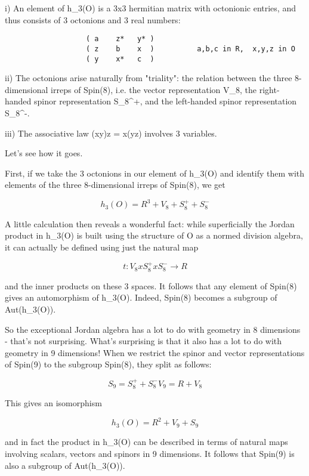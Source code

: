 i) An element of h_{3}(O) is a 3x3 hermitian matrix with octonionic
entries, and thus consists of 3 octonions and 3 real numbers:

\begin{verbatim}
                   ( a    z*   y* )
                   ( z    b    x  )          a,b,c in R,  x,y,z in O
                   ( y    x*   c  )            
\end{verbatim}
    
ii) The octonions arise naturally from "triality": the
relation between the three 8-dimensional irreps of Spin(8), i.e. the
vector representation V_{8}, the right-handed spinor
representation S_{8}^{+}, and the left-handed spinor
representation S_{8}^{-}.

iii) The associative law (xy)z = x(yz) involves 3 variables.

Let's see how it goes.


First, if we take the 3 octonions in our element of h_{3}(O) and
identify them with elements of the three 8-dimensional irreps of
Spin(8), we get

$$
h_{3}(O) = R^{3}  +  V_{8}  +  S_{8}^{+}  +  S_{8}^{-} 
$$
    

A little calculation then reveals a wonderful fact: while superficially
the Jordan product in h_{3}(O) is built using the structure of O
as a normed division algebra, it can actually be defined using just the
natural map

$$
t: V_{8}  x  S_{8}^{+}  x  S_{8}^{-} \to  R
$$
    

and the inner products on these 3 spaces.  It follows that any element
of Spin(8) gives an automorphism of h_{3}(O).  Indeed, Spin(8)
becomes a subgroup of Aut(h_{3}(O)).

So the exceptional Jordan algebra has a lot to do with geometry in 8
dimensions - that's not surprising.  What's surprising is that it also
has a lot to do with geometry in 9 dimensions!  When we restrict the
spinor and vector representations of Spin(9) to the subgroup Spin(8),
they split as follows:

$$
S_{9} = S_{8}^{+}  +  S_{8}^{-}

V_{9} = R  +  V_{8}
$$
    
This gives an isomorphism

$$
h_{3}(O) = R^{2}  +  V_{9}  +  S_{9}
$$
    
and in fact the product in h_{3}(O) can be described in terms of
natural maps involving scalars, vectors and spinors in 9 dimensions.  It
follows that Spin(9) is also a subgroup of Aut(h_{3}(O)).

